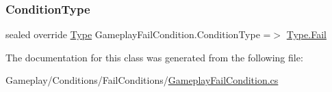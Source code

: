 \subsubsection{\texorpdfstring{Condition\+Type}{ConditionType}}
{\footnotesize\ttfamily sealed override \mbox{\hyperlink{class_gameplay_condition_af7549fe9ce5328062dab831d05ca9702}{Type}} Gameplay\+Fail\+Condition.\+Condition\+Type =$>$ \mbox{\hyperlink{class_gameplay_condition_af7549fe9ce5328062dab831d05ca9702aceaa0734f0b3c738120c67344d8f3ec1}{Type.\+Fail}}}



The documentation for this class was generated from the following file\+:\begin{DoxyCompactItemize}
\item 
Gameplay/\+Conditions/\+Fail\+Conditions/\mbox{\hyperlink{_gameplay_fail_condition_8cs}{Gameplay\+Fail\+Condition.\+cs}}\end{DoxyCompactItemize}
